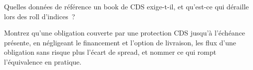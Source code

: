 \begin{interviewq}\label{iq:s2:credit-relative-value:5}
Quelles données de référence un book de CDS exige-t-il, et qu'est-ce qui déraille lors des roll d'indices~?
\end{interviewq}

\begin{interviewq}\label{iq:s2:credit-relative-value:6}
Montrez qu'une obligation couverte par une protection CDS jusqu'à l'échéance présente, en négligeant le financement et l'option de livraison,
les flux d'une obligation sans risque plus l'écart de spread, et nommer ce qui rompt l'équivalence en pratique.
\end{interviewq}
